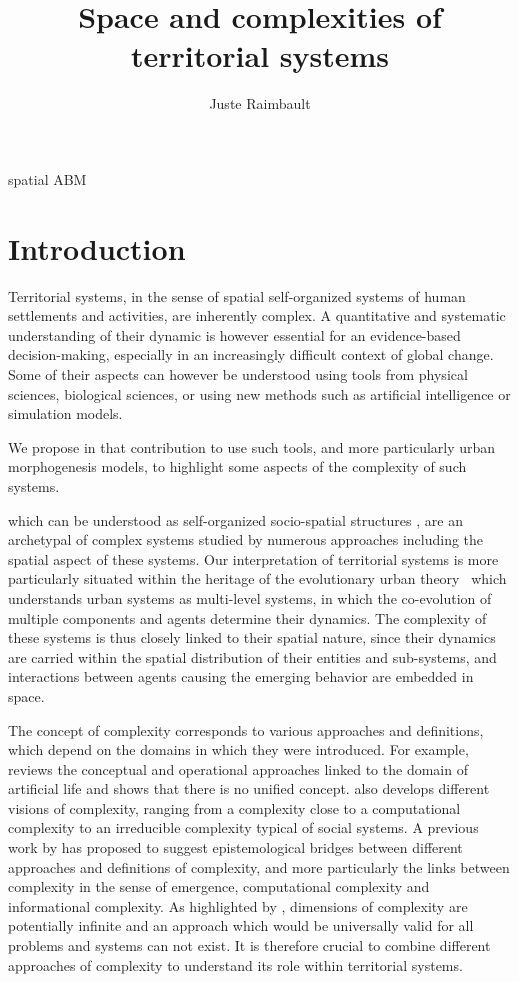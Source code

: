 \documentclass[fleqn,10pt]{wlscirep}
\title{Space and complexities of territorial systems}
\author[1,2,3,*]{Juste Raimbault}
\affil[1]{CASA, UCL, London, UK}
\affil[2]{UPS CNRS 3611 ISC-PIF, Paris, France}
\affil[3]{UMR CNRS 8504 G{\'e}ographie-cit{\'e}s, Paris, France}
\affil[*]{juste.raimbault@polytechnique.edu}
\begin{document}
\flushbottom
\maketitle

\thispagestyle{empty}


\cite{manson2019methodological} spatial ABM

\section*{Introduction}


Territorial systems, in the sense of spatial self-organized systems of human settlements and activities, are inherently complex. A quantitative and systematic understanding of their dynamic is however essential for an evidence-based decision-making, especially in an increasingly difficult context of global change\cite{}. Some of their aspects can however be understood using tools from physical sciences\cite{}, biological sciences\cite{tero2010rules}, or using new methods such as artificial intelligence\cite{} or simulation models\cite{pumain2017urban}.

We propose in that contribution to use such tools, and more particularly urban morphogenesis models, to highlight some aspects of the complexity of such systems.

 which can be understood as self-organized socio-spatial structures  \cite{pumain1997pour}, are an archetypal of complex systems studied by numerous approaches including the spatial aspect of these systems. Our interpretation of territorial systems is more particularly situated within the heritage of the evolutionary urban theory~\cite{pumain2018evolutionary} which understands urban systems as multi-level systems, in which the co-evolution of multiple components and agents determine their dynamics\cite{raimbault2018caracterisation}. The complexity of these systems is thus closely linked to their spatial nature, since their dynamics are carried within the spatial distribution of their entities and sub-systems, and interactions between agents causing the emerging behavior are embedded in space.


The concept of complexity corresponds to various approaches and definitions, which depend on the domains in which they were introduced. For example, \cite{chu2008criteria} reviews the conceptual and operational approaches linked to the domain of artificial life and shows that there is no unified concept. \cite{deffuant2015visions} also develops different visions of complexity, ranging from a complexity close to a computational complexity to an irreducible complexity typical of social systems. A previous work by \cite{raimbault2018relating} has proposed to suggest epistemological bridges between different approaches and definitions of complexity, and more particularly the links between complexity in the sense of emergence, computational complexity and informational complexity. As highlighted by \cite{batty2018defining}, dimensions of complexity are potentially infinite and an approach which would be universally valid for all problems and systems can not exist. It is therefore crucial to combine different approaches of complexity to understand its role within territorial systems.
\end{document}
